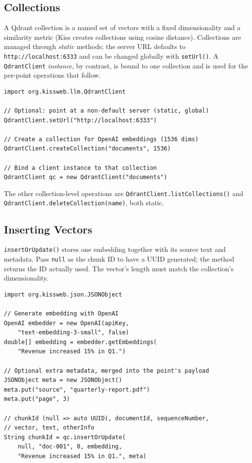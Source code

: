 \subsection{Collections}

A Qdrant collection is a named set of vectors with a fixed dimensionality and a similarity metric (Kiss creates collections using cosine distance).  Collections are managed through \emph{static} methods; the server URL defaults to \texttt{http://localhost:6333} and can be changed globally with \texttt{setUrl()}.  A \texttt{QdrantClient} \emph{instance}, by contrast, is bound to one collection and is used for the per-point operations that follow.

\begin{lstlisting}[style=groovy]
import org.kissweb.llm.QdrantClient

// Optional: point at a non-default server (static, global)
QdrantClient.setUrl("http://localhost:6333")

// Create a collection for OpenAI embeddings (1536 dims)
QdrantClient.createCollection("documents", 1536)

// Bind a client instance to that collection
QdrantClient qc = new QdrantClient("documents")
\end{lstlisting}

\noindent
The other collection-level operations are \texttt{QdrantClient.listCollections()} and \texttt{QdrantClient.deleteCollection(name)}, both static.

\subsection{Inserting Vectors}

\texttt{insertOrUpdate()} stores one embedding together with its source text and metadata.  Pass \texttt{null} as the chunk ID to have a UUID generated; the method returns the ID actually used.  The vector's length must match the collection's dimensionality.

\begin{lstlisting}[style=groovy]
import org.kissweb.json.JSONObject

// Generate embedding with OpenAI
OpenAI embedder = new OpenAI(apiKey,
    "text-embedding-3-small", false)
double[] embedding = embedder.getEmbeddings(
    "Revenue increased 15% in Q1.")

// Optional extra metadata, merged into the point's payload
JSONObject meta = new JSONObject()
meta.put("source", "quarterly-report.pdf")
meta.put("page", 3)

// chunkId (null => auto UUID), documentId, sequenceNumber,
// vector, text, otherInfo
String chunkId = qc.insertOrUpdate(
    null, "doc-001", 0, embedding,
    "Revenue increased 15% in Q1.", meta)
\end{lstlisting}

